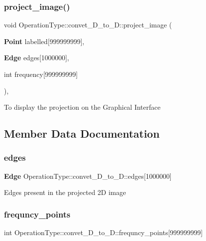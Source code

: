 \subsubsection{project\+\_\+image()}
{\footnotesize\ttfamily void Operation\+Type\+::convet\+\_\+D\+\_\+to\+\_\+D\+::project\+\_\+image (\begin{DoxyParamCaption}\item[{\textbf{ Point}}]{labelled[999999999],  }\item[{\textbf{ Edge}}]{edges[1000000],  }\item[{int}]{frequency[999999999] }\end{DoxyParamCaption})\hspace{0.3cm}{\ttfamily [inline]}, {\ttfamily [private]}}

To display the projection on the Graphical Interface 

\subsection{Member Data Documentation}
\mbox{\label{class_operation_type_1_1convet__3_d__to__2_d_a22bb17327a589e26bf9380523426ac54}} 
\subsubsection{edges}
{\footnotesize\ttfamily \textbf{ Edge} Operation\+Type\+::convet\+\_\+D\+\_\+to\+\_\+D\+::edges[1000000]\hspace{0.3cm}{\ttfamily [private]}}

Edges present in the projected 2D image \mbox{\label{class_operation_type_1_1convet__3_d__to__2_d_a2ad367ef71adaa16c5ab7eee61845043}} 
\subsubsection{frequncy\+\_\+points}
{\footnotesize\ttfamily int Operation\+Type\+::convet\+\_\+D\+\_\+to\+\_\+D\+::frequncy\+\_\+points[999999999]\hspace{0.3cm}{\ttfamily [private]}}

